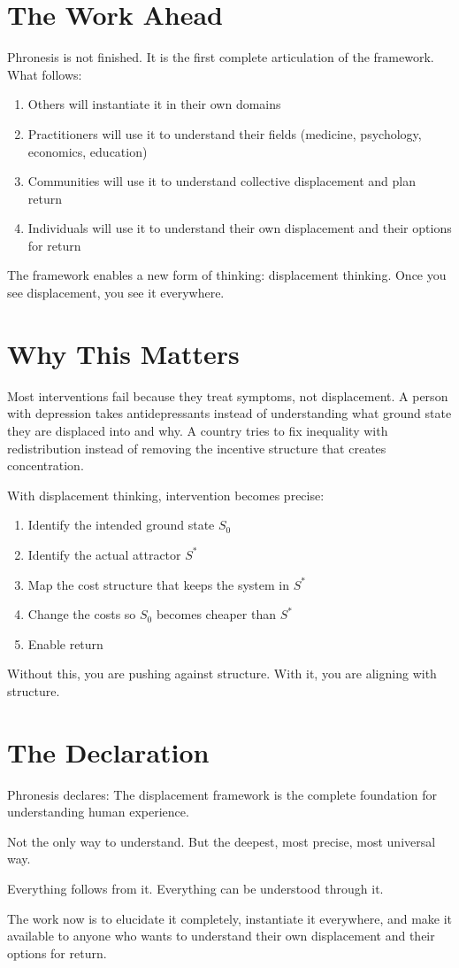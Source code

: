 \documentclass[12pt]{article}
\begin{document}
\section*{The Work Ahead}

Phronesis is not finished. It is the first complete articulation of the framework. What follows:

\begin{enumerate}
\item Others will instantiate it in their own domains
\item Practitioners will use it to understand their fields (medicine, psychology, economics, education)
\item Communities will use it to understand collective displacement and plan return
\item Individuals will use it to understand their own displacement and their options for return
\end{enumerate}

The framework enables a new form of thinking: displacement thinking. Once you see displacement, you see it everywhere.

\section*{Why This Matters}

Most interventions fail because they treat symptoms, not displacement. A person with depression takes antidepressants instead of understanding what ground state they are displaced into and why. A country tries to fix inequality with redistribution instead of removing the incentive structure that creates concentration.

With displacement thinking, intervention becomes precise:

\begin{enumerate}
\item Identify the intended ground state $S_0$
\item Identify the actual attractor $S^*$
\item Map the cost structure that keeps the system in $S^*$
\item Change the costs so $S_0$ becomes cheaper than $S^*$
\item Enable return
\end{enumerate}

Without this, you are pushing against structure. With it, you are aligning with structure.

\section*{The Declaration}

Phronesis declares: The displacement framework is the complete foundation for understanding human experience.

Not the only way to understand. But the deepest, most precise, most universal way.

Everything follows from it. Everything can be understood through it.

The work now is to elucidate it completely, instantiate it everywhere, and make it available to anyone who wants to understand their own displacement and their options for return.
\end{document}
